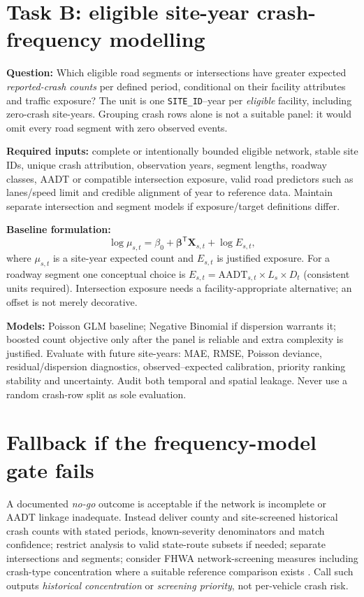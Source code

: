 \documentclass[11pt,a4paper,openany]{report}
\newcommand{\pathcode}[1]{\nolinkurl{#1}}
\begin{document}
\section{Task B: eligible site-year crash-frequency modelling}
\textbf{Question:} Which eligible road segments or intersections have greater expected \emph{reported-crash counts} per defined period, conditional on their facility attributes and traffic exposure? The unit is one \pathcode{SITE_ID}--year per \emph{eligible} facility, including zero-crash site-years. Grouping crash rows alone is not a suitable panel: it would omit every road segment with zero observed events.

\textbf{Required inputs:} complete or intentionally bounded eligible network, stable site IDs, unique crash attribution, observation years, segment lengths, roadway classes, AADT or compatible intersection exposure, valid road predictors such as lanes/speed limit and credible alignment of year to reference data. Maintain separate intersection and segment models if exposure/target definitions differ.

\textbf{Baseline formulation:}
\begin{equation}\log \mu_{s,t}=\beta_0+\boldsymbol\beta^{\mathsf T}\mathbf X_{s,t}+\log E_{s,t},\end{equation}
where $\mu_{s,t}$ is a site-year expected count and $E_{s,t}$ is justified exposure. For a roadway segment one conceptual choice is $E_{s,t}=\mathrm{AADT}_{s,t}\times L_s\times D_t$ (consistent units required). Intersection exposure needs a facility-appropriate alternative; an offset is not merely decorative.

\textbf{Models:} Poisson GLM baseline; Negative Binomial if dispersion warrants it; boosted count objective only after the panel is reliable and extra complexity is justified. Evaluate with future site-years: MAE, RMSE, Poisson deviance, residual/dispersion diagnostics, observed--expected calibration, priority ranking stability and uncertainty. Audit both temporal and spatial leakage. Never use a random crash-row split as sole evaluation.

\section{Fallback if the frequency-model gate fails}
A documented \emph{no-go} outcome is acceptable if the network is incomplete or AADT linkage inadequate. Instead deliver county and site-screened historical crash counts with stated periods, known-severity denominators and match confidence; restrict analysis to valid state-route subsets if needed; separate intersections and segments; consider FHWA network-screening measures including crash-type concentration where a suitable reference comparison exists \cite{FHWA_screen}. Call such outputs \emph{historical concentration} or \emph{screening priority}, not per-vehicle crash risk.
\end{document}
